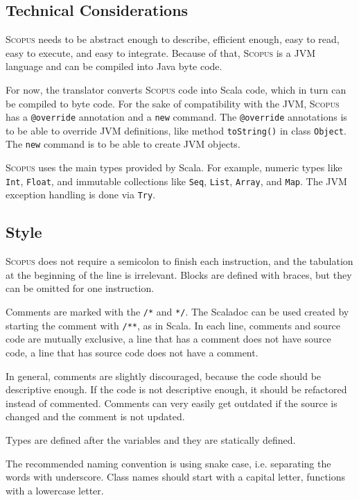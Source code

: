 \documentclass[12pt,a4paper]{article}
\makeatletter
\newcommand{\srccode}[1]{\texttt{{#1}}}
\newcommand{\reservedWord}[1]{{\color{blue}\srccode{#1}}\xspace}
\newcommand{\annotation}[1]{{\color{brown}\srccode{#1}}\xspace}
\newcommand{\snew}{\reservedWord{new}}
\newcommand{\soverride}{\annotation{@override}}
\newcommand{\Scopus}{\textsc{Scopus}\xspace}
\makeatother
\begin{document}
    \subsection{Technical Considerations}

    \Scopus needs to be abstract enough to describe, efficient enough, easy to read, easy to execute, and easy to integrate.
    Because of that, \Scopus is a JVM language and can be compiled into Java byte code.

    For now, the translator converts \Scopus code into Scala code, which in turn can be compiled to byte code.
    For the sake of compatibility with the JVM, \Scopus has a \soverride annotation and a \snew command.
    The \soverride annotations is to be able to override JVM definitions, like method \srccode{toString()} in class \srccode{Object}.
    The \snew command is to be able to create JVM objects.

    \Scopus uses the main types provided by Scala.
    For example, numeric types like \srccode{Int}, \srccode{Float}, and immutable collections like \srccode{Seq}, \srccode{List}, \srccode{Array}, and \srccode{Map}.
    The JVM exception handling is done via \srccode{Try}.

    \subsection{Style}

    \Scopus does not require a semicolon to finish each instruction, and the tabulation at the beginning of the line is irrelevant.
    Blocks are defined with braces, but they can be omitted for one instruction.

    Comments are marked with the \srccode{/*} and  \srccode{*/}.
    The Scaladoc can be used created by starting the comment with \srccode{/**}, as in Scala.
    In each line, comments and source code are mutually exclusive, a line that has a comment does not have source code, a line that has source code does not have a comment.

    In general, comments are slightly discouraged, because the code should be descriptive enough.
    If the code is not descriptive enough, it should be refactored instead of commented.
    Comments can very easily get outdated if the source is changed and the comment is not updated.

    Types are defined after the variables and they are statically defined.

    The recommended naming convention is using snake case, i.e. separating the words with underscore.
    Class names should start with a capital letter, functions with a lowercase letter.
\end{document}
